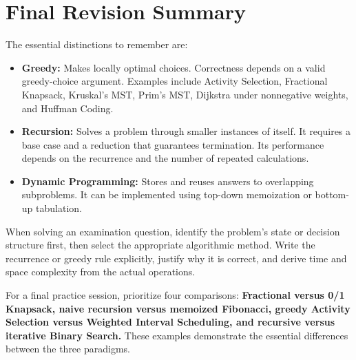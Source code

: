 \section{Final Revision Summary}

The essential distinctions to remember are:

\begin{itemize}
    \item \textbf{Greedy:} Makes locally optimal choices. Correctness depends on a valid greedy-choice argument. Examples include Activity Selection, Fractional Knapsack, Kruskal's MST, Prim's MST, Dijkstra under nonnegative weights, and Huffman Coding.
    \item \textbf{Recursion:} Solves a problem through smaller instances of itself. It requires a base case and a reduction that guarantees termination. Its performance depends on the recurrence and the number of repeated calculations.
    \item \textbf{Dynamic Programming:} Stores and reuses answers to overlapping subproblems. It can be implemented using top-down memoization or bottom-up tabulation.
\end{itemize}

When solving an examination question, identify the problem's state or decision structure first, then select the appropriate algorithmic method. Write the recurrence or greedy rule explicitly, justify why it is correct, and derive time and space complexity from the actual operations.

For a final practice session, prioritize four comparisons: \textbf{Fractional versus 0/1 Knapsack, naive recursion versus memoized Fibonacci, greedy Activity Selection versus Weighted Interval Scheduling, and recursive versus iterative Binary Search.} These examples demonstrate the essential differences between the three paradigms.